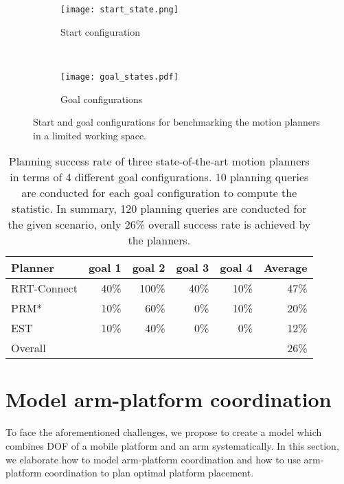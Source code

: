 \begin{figure}[!htbp]
\captionsetup[subfigure]{position=b}
    \centering
    \begin{subfigure}[t]{0.23\textwidth}
        \texttt{[image: start\_state.png]}
        \caption{Start configuration }
        \label{fig:start_state}
    \end{subfigure}
    ~ %

    \begin{subfigure}[t]{0.9\textwidth}
        \texttt{[image: goal\_states.pdf]}
        \caption{Goal configurations}
        \label{fig:goal_states}
    \end{subfigure}
    \caption{Start and goal configurations for benchmarking the motion planners in a limited working space.}\label{fig:moveit_planning}
\end{figure} 

\begin{table}[!htbp]
\centering
\begin{tabular}{lrrrr|r}
Planner     & goal 1 & goal 2 & goal 3 & goal 4 & Average \\ 
\hline
\hline
RRT-Connect & 40\%   & 100\%  & 40\%   & 10\%   & 47\%    \\
PRM*        & 10\%   & 60\%   & 0\%    & 10\%   & 20\%    \\
EST         & 10\%   & 40\%   & 0\%    & 0\%    & 12\%    \\ \hline
Overall     &        &        &        &        & 26\%   
\end{tabular}
\caption{Planning success rate of three state-of-the-art motion planners in terms of 4 different goal configurations. 10 planning queries are conducted for each goal configuration to compute the statistic. In summary, 120 planning queries are conducted for the given scenario, only 26\% overall success rate is achieved by the planners. } 
\label{tab:benchmark_result}
\end{table}

\section{Model arm-platform coordination}
To face the aforementioned challenges, we propose to create a model which combines DOF of a mobile platform and an arm systematically. In this section, we elaborate how to model arm-platform coordination and how to use arm-platform coordination to plan optimal platform placement.
